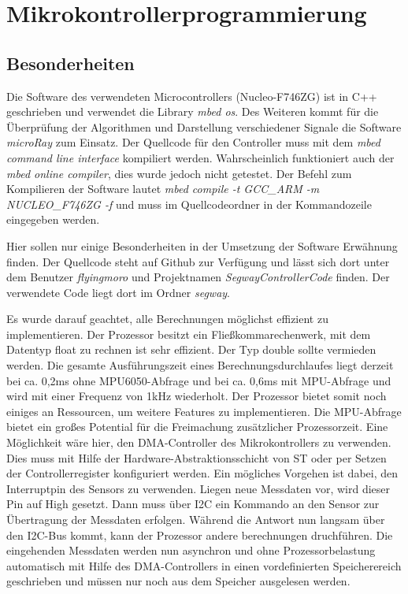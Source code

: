 \renewcommand{\autoren}{Stephan Morongowski}
\newpage
\section{Mikrokontrollerprogrammierung}
\subsection{Besonderheiten}
Die Software des verwendeten Microcontrollers (Nucleo-F746ZG) ist in C++ geschrieben und verwendet die Library \textit{mbed os}. Des Weiteren kommt für die Überprüfung der Algorithmen und Darstellung verschiedener Signale die Software \textit{microRay} zum Einsatz. Der Quellcode für den Controller muss mit dem \textit{mbed command line interface} kompiliert werden. Wahrscheinlich funktioniert auch der \textit{mbed online compiler}, dies wurde jedoch nicht getestet. Der Befehl zum Kompilieren der Software lautet \textit{mbed compile -t GCC\_ARM -m NUCLEO\_F746ZG -f} und muss im Quellcodeordner in der Kommandozeile eingegeben werden.

Hier sollen nur einige Besonderheiten in der Umsetzung der Software Erwähnung finden. Der Quellcode steht auf Github zur Verfügung und lässt sich dort unter dem Benutzer \textit{flyingmoro} und Projektnamen \textit{SegwayControllerCode} finden. Der verwendete Code liegt dort im Ordner \textit{segway}.

Es wurde darauf geachtet, alle Berechnungen möglichst effizient zu implementieren. Der Prozessor besitzt ein Fließkommarechenwerk, mit dem Datentyp float zu rechnen ist sehr effizient. Der Typ double sollte vermieden werden. Die gesamte Ausführungszeit eines Berechnungsdurchlaufes liegt derzeit bei ca. 0,2ms ohne MPU6050-Abfrage und bei ca. 0,6ms mit MPU-Abfrage und wird mit einer Frequenz von 1kHz wiederholt. Der Prozessor bietet somit noch einiges an Ressourcen, um weitere Features zu implementieren. Die MPU-Abfrage bietet ein großes Potential für die Freimachung zusätzlicher Prozessorzeit. Eine Möglichkeit wäre hier, den DMA-Controller des Mikrokontrollers zu verwenden. Dies muss mit Hilfe der Hardware-Abstraktionsschicht von ST oder per Setzen der Controllerregister konfiguriert werden. Ein mögliches Vorgehen ist dabei, den Interruptpin des Sensors zu verwenden. Liegen neue Messdaten vor, wird dieser Pin auf High gesetzt. Dann muss über I2C ein Kommando an den Sensor zur Übertragung der Messdaten erfolgen. Während die Antwort nun langsam über den I2C-Bus kommt, kann der Prozessor andere berechnungen druchführen. Die eingehenden Messdaten werden nun asynchron und ohne Prozessorbelastung automatisch mit Hilfe des DMA-Controllers in einen vordefinierten Speicherereich geschrieben und müssen nur noch aus dem Speicher ausgelesen werden.




